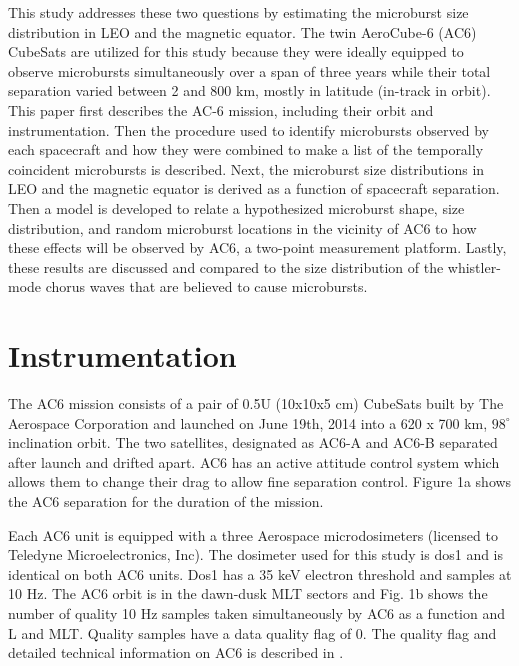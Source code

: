 \documentclass[draft]{agujournal2019}
\begin{document}
This study addresses these two questions by estimating the microburst size distribution in LEO and the magnetic equator. The twin AeroCube-6 (AC6) CubeSats are utilized for this study because they were ideally equipped to observe microbursts simultaneously over a span of three years while their total separation varied between 2 and 800 km, mostly in latitude (in-track in orbit). This paper first describes the AC-6 mission, including their orbit and instrumentation. Then the procedure used to identify microbursts observed by each spacecraft and how they were combined to make a list of the temporally coincident microbursts is described. Next, the microburst size distributions in LEO and the magnetic equator is derived as a function of spacecraft separation. Then a model is developed to relate a hypothesized microburst shape, size distribution, and random microburst locations in the vicinity of AC6 to how these effects will be observed by AC6, a two-point measurement platform. Lastly, these results are discussed and compared to the size distribution of the whistler-mode chorus waves that are believed to cause microbursts. 

\section{Instrumentation}
The AC6 mission consists of a pair of 0.5U (10x10x5 cm) CubeSats built by The Aerospace Corporation and launched on June 19th, 2014 into a 620 x 700 km, $98^\circ$ inclination orbit. The two satellites, designated as AC6-A and AC6-B separated after launch and drifted apart. AC6 has an active attitude control system which allows them to change their drag to allow fine separation control. Figure 1a shows the AC6 separation for the duration of the mission.

Each AC6 unit is equipped with a three Aerospace microdosimeters (licensed to Teledyne Microelectronics, Inc). The dosimeter used for this study is dos1 and is identical on both AC6 units. Dos1 has a 35 keV electron threshold and samples at 10 Hz. The AC6 orbit is in the dawn-dusk MLT sectors and Fig. 1b shows the number of quality 10 Hz samples taken simultaneously by AC6 as a function and L and MLT. Quality samples have a data quality flag of 0. The quality flag and detailed technical information on AC6 is described in .
\end{document}
